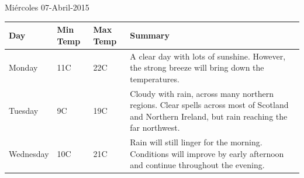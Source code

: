 \documentclass{article}
\begin{document}

 \begin{flushright}
   Miércoles 07-Abril-2015
 \end{flushright}


 \begin{tabular}{ | l | l | l | p{5cm} |}
   \hline
   Day & Min Temp & Max Temp & Summary \\ \hline
   Monday & 11C & 22C & A clear day with lots of sunshine.  
   However, the strong breeze will bring down the temperatures. \\ \hline
   Tuesday & 9C & 19C & Cloudy with rain, across many northern regions. Clear spells 
   across most of Scotland and Northern Ireland, 
   but rain reaching the far northwest. \\ \hline
   Wednesday & 10C & 21C & Rain will still linger for the morning. 
   Conditions will improve by early afternoon and continue 
   throughout the evening. \\
   \hline
   \end{tabular}
   
   
   \begin{table}[h]  \end{table}
  
  
\end{document}
